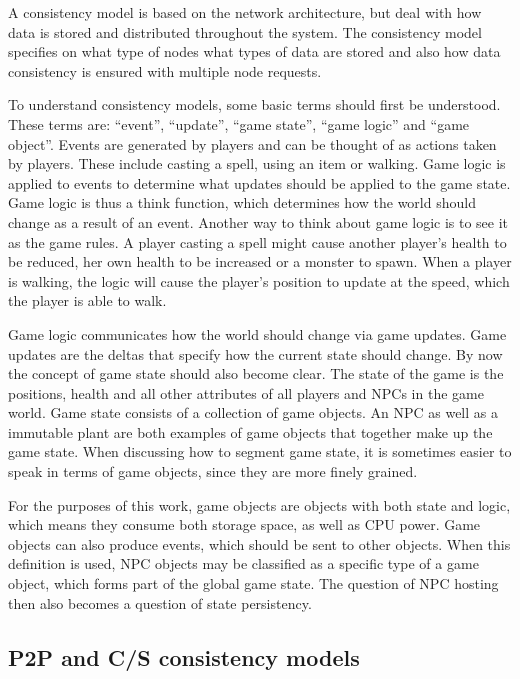 \documentclass[journal,oneside,a4paper,onecolumn]{IEEEtran}
\begin{document}
A consistency model is based on the network architecture, but deal with how data is stored and distributed throughout the system. The consistency model specifies on what type of nodes what types of data are stored and also how data consistency is ensured with multiple node requests.

To understand consistency models, some basic terms should first be understood. These terms are: ``event'', ``update'', ``game state'', ``game logic'' and ``game object''. Events are generated by players and can be thought of as actions taken by players. These include casting a spell, using an item or walking. Game logic is applied to events to determine what updates should be applied to the game state. Game logic is thus a think function, which determines how the world should change as a result of an event. Another way to think about game logic is to see it as the game rules. A player casting a spell might cause another player's health to be reduced, her own health to be increased or a monster to spawn. When a player is walking, the logic will cause the player's position to update at the speed, which the player is able to walk.

Game logic communicates how the world should change via game updates. Game updates are the deltas that specify how the current state should change. By now the concept of game state should also become clear. The state of the game is the positions, health and all other attributes of all players and NPCs in the game world. Game state consists of a collection of game objects. An NPC as well as a immutable plant are both examples of game objects that together make up the game state. When discussing how to segment game state, it is sometimes easier to speak in terms of game objects, since they are more finely grained.

For the purposes of this work, game objects are objects with both state and logic, which means they consume both storage space, as well as CPU power. Game objects can also produce events, which should be sent to other objects. When this definition is used, NPC objects may be classified as a specific type of a game object, which forms part of the global game state. The question of NPC hosting then also becomes a question of state persistency.

\subsection{P2P and C/S consistency models}
\label{classic_models}
\end{document}
